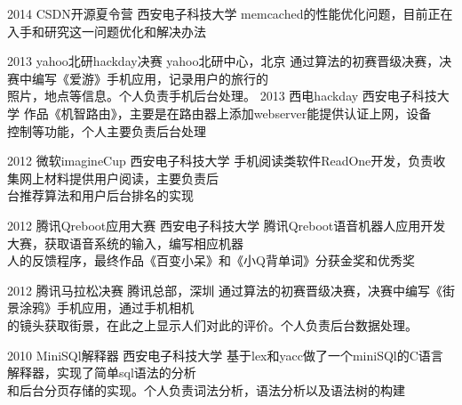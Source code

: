 \documentclass[]{friggeri-cv} %
\begin{document}
\begin{entrylist}

\entry
{2014}
{CSDN开源夏令营}
{西安电子科技大学}
{memcached的性能优化问题，目前正在入手和研究这一问题优化和解决办法}

\entry
{2013}
{yahoo北研hackday决赛}
{yahoo北研中心，北京}
{通过算法的初赛晋级决赛，决赛中编写《爱游》手机应用，记录用户的旅行的\\
照片，地点等信息。个人负责手机后台处理。}
\entry
{2013}
{西电hackday}
{西安电子科技大学}
{作品《机智路由》，主要是在路由器上添加webserver能提供认证上网，设备\\
控制等功能，个人主要负责后台处理}

\entry
{2012}
{微软imagineCup}
{西安电子科技大学}
{手机阅读类软件ReadOne开发，负责收集网上材料提供用户阅读，主要负责后\\
台推荐算法和用户后台排名的实现}

\entry
{2012}
{腾讯Qreboot应用大赛}
{西安电子科技大学}
{腾讯Qreboot语音机器人应用开发大赛，获取语音系统的输入，编写相应机器\\
人的反馈程序，最终作品《百变小呆》和《小Q背单词》分获金奖和优秀奖}

\entry
{2012}
{腾讯马拉松决赛}
{腾讯总部，深圳}
{通过算法的初赛晋级决赛，决赛中编写《街景涂鸦》手机应用，通过手机相机\\
的镜头获取街景，在此之上显示人们对此的评价。个人负责后台数据处理。}

\entry
{2010}
{MiniSQl解释器}
{西安电子科技大学}
{基于lex和yacc做了一个miniSQl的C语言解释器，实现了简单sql语法的分析\\
和后台分页存储的实现。个人负责词法分析，语法分析以及语法树的构建 }
\end{entrylist}






\end{document}
